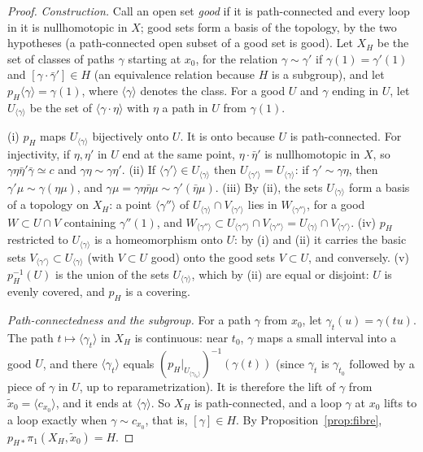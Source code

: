 \begin{proof}
\emph{Construction.} Call an open set \emph{good} if it is path-connected and every loop in it is nullhomotopic in $X$; good sets form a basis of the topology, by the two
hypotheses (a path-connected open subset of a good set is good). Let $X_H$ be the set of classes of paths $\gamma$ starting at $x_0$, for the relation $\gamma\sim\gamma'$ if
$\gamma(1)=\gamma'(1)$ and $[\gamma\cdot\bar\gamma']\in H$ (an equivalence relation because $H$ is a subgroup), and let $p_H\langle\gamma\rangle=\gamma(1)$, where $\langle\gamma\rangle$ denotes the class.
For a good $U$ and $\gamma$ ending in $U$, let $U_{\langle\gamma\rangle}$ be the set of $\langle\gamma\cdot\eta\rangle$ with $\eta$ a path in $U$ from $\gamma(1)$.

(i) $p_H$ maps $U_{\langle\gamma\rangle}$ bijectively onto $U$. It is onto because $U$ is path-connected. For injectivity, if $\eta,\eta'$ in $U$ end at the same point, $\eta\cdot\bar\eta'$ is nullhomotopic in $X$, so
$\gamma\eta\bar\eta'\bar\gamma\simeq c$ and $\gamma\eta\sim\gamma\eta'$. (ii) If $\langle\gamma'\rangle\in U_{\langle\gamma\rangle}$ then $U_{\langle\gamma'\rangle}=U_{\langle\gamma\rangle}$: if $\gamma'\sim\gamma\eta$, then $\gamma'\mu\sim\gamma(\eta\mu)$, and $\gamma\mu=\gamma\eta\bar\eta\mu\sim\gamma'(\bar\eta\mu)$.
(iii) By (ii), the sets $U_{\langle\gamma\rangle}$ form a basis of a topology on $X_H$: a point $\langle\gamma''\rangle$ of $U_{\langle\gamma\rangle}\cap V_{\langle\gamma'\rangle}$ lies in $W_{\langle\gamma''\rangle}$, for a good $W\subset U\cap V$
containing $\gamma''(1)$, and $W_{\langle\gamma''\rangle}\subset U_{\langle\gamma''\rangle}\cap V_{\langle\gamma''\rangle}=U_{\langle\gamma\rangle}\cap V_{\langle\gamma'\rangle}$. (iv) $p_H$ restricted to $U_{\langle\gamma\rangle}$ is a homeomorphism onto $U$: by (i) and (ii) it carries the basic sets
$V_{\langle\gamma'\rangle}\subset U_{\langle\gamma\rangle}$ (with $V\subset U$ good) onto the good sets $V\subset U$, and conversely. (v) $p_H^{-1}(U)$ is the union of the sets $U_{\langle\gamma\rangle}$, which by (ii) are equal or disjoint:
$U$ is evenly covered, and $p_H$ is a covering.

\emph{Path-connectedness and the subgroup.} For a path $\gamma$ from $x_0$, let $\gamma_t(u)=\gamma(tu)$. The path $t\mapsto\langle\gamma_t\rangle$ in $X_H$ is continuous: near $t_0$, $\gamma$ maps a small interval
into a good $U$, and there $\langle\gamma_t\rangle$ equals $(p_H|_{U_{\langle\gamma_{t_0}\rangle}})^{-1}(\gamma(t))$ (since $\gamma_t$ is $\gamma_{t_0}$ followed by a piece of $\gamma$ in $U$, up to reparametrization). It is therefore
the lift of $\gamma$ from $\tilde x_0=\langle c_{x_0}\rangle$, and it ends at $\langle\gamma\rangle$. So $X_H$ is path-connected, and a loop $\gamma$ at $x_0$ lifts to a loop exactly when $\gamma\sim c_{x_0}$, that is,
$[\gamma]\in H$. By Proposition~\ref{prop:fibre}, $p_{H*}\pi_1(X_H,\tilde x_0)=H$.


\end{proof}
